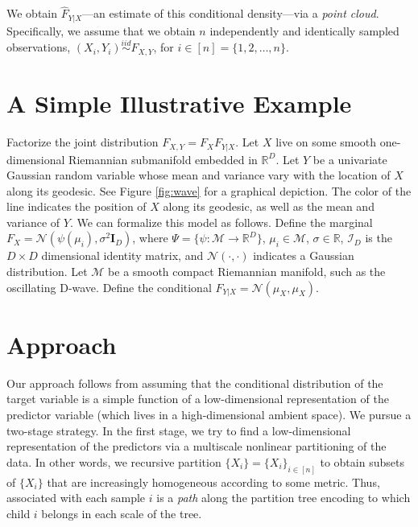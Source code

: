 \documentclass{article}
\newcommand{\iid}{\overset{iid}{\sim}}
\newcommand{\Real}{\mathbb{R}}
\providecommand{\mh}[1]{\hat{#1}}
\providecommand{\mb}[1]{\boldsymbol{#1}}
\providecommand{\mc}[1]{\mathcal{#1}}
\newcommand{\from}{{\ensuremath{\colon}}}           %
\begin{document}
We obtain $\mh{F}_{Y|X}$---an estimate of this conditional density---via a \emph{point cloud}.  Specifically, we assume that we obtain $n$ independently and identically sampled observations, $(X_i,Y_i) \iid F_{X,Y}$, for $i \in [n]=\{1,2,\ldots,n\}$. 



\section{A Simple Illustrative Example} %
\label{sec:a_simple_illustrative_example}

Factorize the joint distribution $F_{X,Y}=F_X F_{Y|X}$.  Let $X$ live on some smooth one-dimensional Riemannian submanifold embedded in $\Real^D$.  Let $Y$ be a univariate Gaussian random variable whose mean and variance vary with the location of $X$ along its geodesic.  
See Figure \ref{fig:wave} for a graphical depiction. The color of the line indicates the position of $X$ along its geodesic, as well as the mean and variance of $Y$.
We can formalize this model as follows.
Define the marginal $F_X = \mc{N}(\psi(\mu_i),\sigma^2 \mb{I}_D)$, where $\Psi =\{ \psi \from \mc{M} \to \Real^D\}$, $\mu_i \in \mc{M}$, $\sigma \in \Real$, $\mc{I}_D$ is the $D\times D$ dimensional identity matrix, and $\mc{N}(\cdot,\cdot)$ indicates a Gaussian distribution.  Let $\mc{M}$ be a smooth compact Riemannian manifold, such as the oscillating D-wave.
% 
% 
Define the conditional $F_{Y|X} = \mc{N}( \mu_X, \mu_X)$.  





\section{Approach} %
\label{sec:approach}



Our approach follows from assuming that the conditional distribution of the target variable is a simple function of a low-dimensional representation of the predictor variable (which lives in a high-dimensional ambient space).  We pursue a two-stage strategy.  In the first stage, we try to find a low-dimensional representation of the predictors via a multiscale nonlinear partitioning of the data.  In other words, we recursive partition $\{X_i\}=\{X_i\}_{i \in [n]}$ to obtain subsets of $\{X_i\}$ that are increasingly homogeneous according to some metric.  Thus, associated with each sample $i$ is a \emph{path} along the partition tree encoding to which child $i$ belongs in each scale of the tree.  
\end{document}
